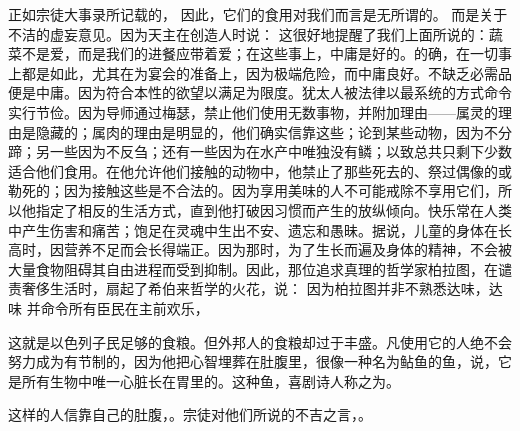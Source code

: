 正如宗徒大事录所记载的，  因此，它们的食用对我们而言是无所谓的。  而是关于不洁的虚妄意见。因为天主在创造人时说：    这很好地提醒了我们上面所说的：蔬菜不是爱，而是我们的进餐应带着爱；在这些事上，中庸是好的。的确，在一切事上都是如此，尤其在为宴会的准备上，因为极端危险，而中庸良好。不缺乏必需品便是中庸。因为符合本性的欲望以满足为限度。犹太人被法律以最系统的方式命令实行节俭。因为导师通过梅瑟，禁止他们使用无数事物，并附加理由——属灵的理由是隐藏的；属肉的理由是明显的，他们确实信靠这些；论到某些动物，因为不分蹄；另一些因为不反刍；还有一些因为在水产中唯独没有鳞；以致总共只剩下少数适合他们食用。在他允许他们接触的动物中，他禁止了那些死去的、祭过偶像的或勒死的；因为接触这些是不合法的。因为享用美味的人不可能戒除不享用它们，所以他指定了相反的生活方式，直到他打破因习惯而产生的放纵倾向。快乐常在人类中产生伤害和痛苦；饱足在灵魂中生出不安、遗忘和愚昧。据说，儿童的身体在长高时，因营养不足而会长得端正。因为那时，为了生长而遍及身体的精神，不会被大量食物阻碍其自由进程而受到抑制。因此，那位追求真理的哲学家柏拉图，在谴责奢侈生活时，扇起了希伯来哲学的火花，说： 因为柏拉图并非不熟悉达味，达味 并命令所有臣民在主前欢乐，\par

这就是以色列子民足够的食粮。但外邦人的食粮却过于丰盛。凡使用它的人绝不会努力成为有节制的，因为他把心智埋葬在肚腹里，很像一种名为鲇鱼的鱼，说，它是所有生物中唯一心脏长在胃里的。这种鱼，喜剧诗人称之为。\par

这样的人信靠自己的肚腹，。宗徒对他们所说的不吉之言，。\par


